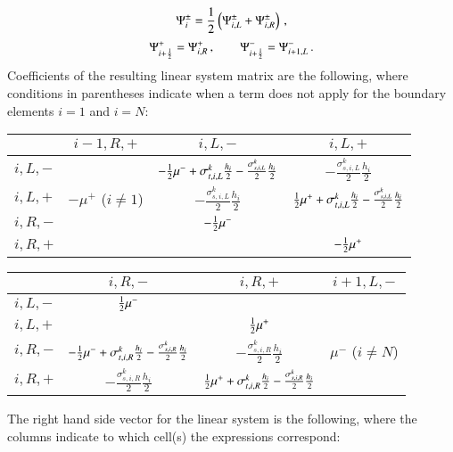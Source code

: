 \documentclass[preprint,12pt]{elsarticle}
\newcommand{\sigsL}{\frac{\sigma_{s,i,L}^k}{2}}
\newcommand{\sigsR}{\frac{\sigma_{s,i,R}^k}{2}}
\newcommand{\sigtL}{\sigma_{t,i,L}^k}
\newcommand{\sigtR}{\sigma_{t,i,R}^k}
\newcommand{\halfh}{\frac{h_i}{2}}
\begin{document}
\begin{equation}
  \Psi_i^\pm=\frac{1}{2}\left( \Psi_{i,L}^\pm + \Psi_{i,R}^\pm \right) \, ,
\end{equation}
\begin{equation}
  \Psi_{i+\frac{1}{2}}^+=\Psi_{i,R}^+ \, ,\qquad \Psi_{i+\frac{1}{2}}^-=\Psi_{i+1,L}^- \, .
\end{equation}
Coefficients of the resulting linear system matrix are the following,
where conditions in parentheses indicate when a term does not
apply for the boundary elements $i=1$ and $i=N$:
\begin{center}
\begin{tabular}{|l||c|c|c|}\hline
          & $i-1,R,+$ & $i,L,-$ & $i,L,+$\\\hline\hline
  $i,L,-$ &
          & $-\half\mu^- + \sigtL\halfh - \sigsL\halfh$
          & $-\sigsL\halfh$ \\\hline
  $i,L,+$ & $-\mu^+$ ($i\ne 1$)
          & $-\sigsL\halfh$
          & $\half\mu^+ + \sigtL\halfh - \sigsL\halfh$ \\\hline
  $i,R,-$ &
          & $-\frac{1}{2}\mu^-$
          & \\\hline
  $i,R,+$ &
          &
          & $-\frac{1}{2}\mu^+$ \\\hline
\end{tabular}
\end{center}
\begin{center}
\begin{tabular}{|l||c|c|c|}\hline
          & $i,R,-$ & $i,R,+$ & $i+1,L,-$\\\hline\hline
  $i,L,-$ & $\frac{1}{2}\mu^-$
          &
          & \\\hline
  $i,L,+$ &
          & $\frac{1}{2}\mu^+$
          & \\\hline
  $i,R,-$ & $-\half\mu^- + \sigtR\halfh - \sigsR\halfh$
          & $-\sigsR\halfh$
          & $\mu^-$ ($i\ne N$) \\\hline
  $i,R,+$ & $-\sigsR\halfh$
          & $\half\mu^+ + \sigtR\halfh - \sigsR\halfh$
          & \\\hline
\end{tabular}
\end{center}
The right hand side vector for the linear system is the following,
where the columns indicate to which cell(s) the expressions
correspond:
\end{document}
